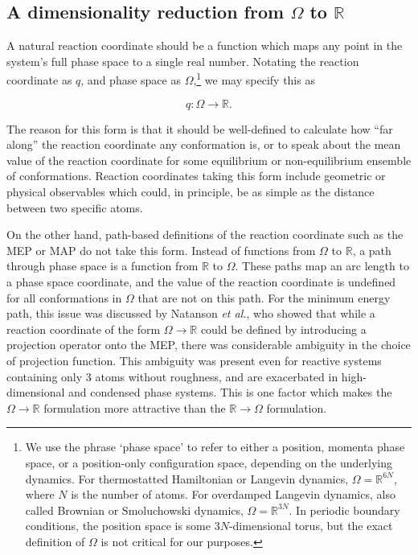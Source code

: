 \documentclass[aip, jcp, reprint, nolinenumbers, twocolumn, nobalancelastpage]{revtex4-1} %
\begin{document}
\subsection{A dimensionality reduction from $\Omega$ to $\mathbb{R}$}

A natural reaction coordinate should be a function which maps any point in the system's full phase space to a single real number. Notating the reaction coordinate as $q$, and phase space as $\Omega$,\footnote{We use the phrase `phase space' to refer to either a position, momenta phase space, or a position-only configuration space, depending on the underlying dynamics. For thermostatted Hamiltonian or Langevin dynamics, $\Omega=\mathbb{R}^{6N}$, where $N$ is the number of atoms. For overdamped Langevin dynamics, also called Brownian or Smoluchowski dynamics, $\Omega=\mathbb{R}^{3N}$. In periodic boundary conditions, the position space is some $3N$-dimensional torus, but the exact definition of $\Omega$ is not critical for our purposes.} we may specify this as

$$
q : \Omega \rightarrow \mathbb{R}.
$$

The reason for this form is that it should be well-defined to calculate how ``far along'' the reaction coordinate any conformation is, or to speak about the mean value of the reaction coordinate for some equilibrium or non-equilibrium ensemble of conformations. Reaction coordinates taking this form include geometric or physical observables which could, in principle, be as simple as the distance between two specific atoms.

On the other hand, path-based definitions of the reaction coordinate such as the MEP or MAP do not take this form. Instead of functions from $\Omega$ to $\mathbb{R}$, a path through phase space is a function from $\mathbb{R}$ to $\Omega$. These paths map an arc length to a phase space coordinate, and the value of the reaction coordinate is undefined for all conformations in $\Omega$ that are not on this path. For the minimum energy path, this issue was discussed by Natanson \emph{et al.}, \cite{natanson1991definition} who showed that while a reaction coordinate of the form $\Omega \rightarrow \mathbb{R}$ could be defined by introducing a projection operator onto the MEP, there was considerable ambiguity in the choice of projection function. This ambiguity was present even for reactive systems containing only 3 atoms without roughness, and are exacerbated in high-dimensional and condensed phase systems. This is one factor which makes the $\Omega \rightarrow \mathbb{R}$ formulation more attractive than the $\mathbb{R} \rightarrow \Omega$ formulation.
\end{document}
